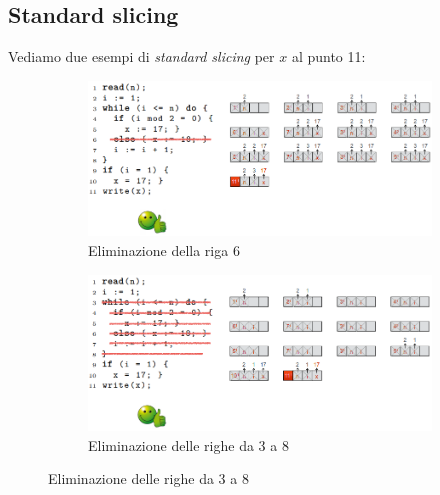 \documentclass[a4paper,oneside,titlepage]{book}
\begin{document}
\subsection{Standard slicing}
Vediamo due esempi di \textit{standard slicing} per $x$ al punto 11:
\begin{figure}[htp]
	\begin{subfigure}{0.49\textwidth}
	    \centering
		\includegraphics[width=\textwidth, height=\textheight, keepaspectratio]{standard1.png}
		\caption{Eliminazione della riga 6}
	\end{subfigure}
	\hfill
	\begin{subfigure}{0.49\textwidth}
	    \centering
		\includegraphics[width=\textwidth, height=\textheight, keepaspectratio]{standard2.png}
		\caption{Eliminazione delle righe da 3 a 8}
	\end{subfigure}
\end{figure}
\end{document}
